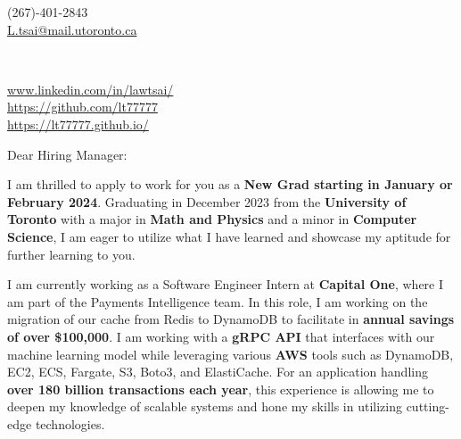 \documentclass[10.5pt,a4]{article}
\begin{document}
\begin{center}
    \begin{minipage}[b]{0.24\textwidth}
            \large (267)-401-2843 \\
            \large \href{mailto:L.tsai@mail.utoronto.ca}{L.tsai@mail.utoronto.ca} 
    \end{minipage}%
    \begin{minipage}[b]{0.5\textwidth}
             \\ %
            \vspace{0.1cm}
            {\color{UI_blue} \Large{}}
    \end{minipage}%
    \begin{minipage}[b]{0.33\textwidth}
            \flushright \small
            {\href{www.linkedin.com/in/lawtsai/}{www.linkedin.com/in/lawtsai/} } \\
            \href{https://github.com/lt77777}{https://github.com/lt77777} \\
            \href{https://lt77777.github.io/}
            {https://lt77777.github.io/}
    \end{minipage}   
    
\vspace{-0.15cm} 
{\color{UI_blue} \hrulefill}
\end{center}

\justify
\setlength{\parindent}{0pt}
\setlength{\parskip}{12pt}
\vspace{0.2cm}




Dear Hiring Manager:

I am thrilled to apply to work for you as a \textbf{New Grad starting in January or February 2024}. Graduating in December 2023 from the \textbf{University of Toronto} with a major in \textbf{Math and Physics} and a minor in \textbf{Computer Science}, I am eager to utilize what I have learned and showcase my aptitude for further learning to you.

I am currently working as a Software Engineer Intern at \textbf{Capital One}, where I am part of the Payments Intelligence team. In this role, I am working on the migration of our cache from Redis to DynamoDB to facilitate in \textbf{annual savings of over \$100,000}. I am working with a \textbf{gRPC API} that interfaces with our machine learning model while leveraging various \textbf{AWS} tools such as DynamoDB, EC2, ECS, Fargate, S3, Boto3, and ElastiCache. For an application handling \textbf{over 180 billion transactions each year}, this experience is allowing me to deepen my knowledge of scalable systems and hone my skills in utilizing cutting-edge technologies.
\end{document}
